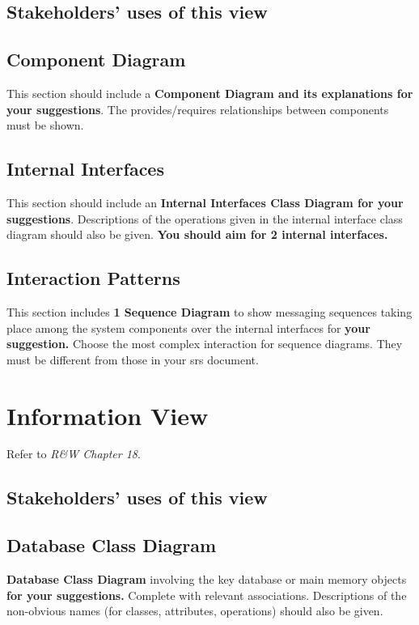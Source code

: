 \subsection{Stakeholders’ uses of this view}

\subsection{Component Diagram}

This section should include a \textbf{Component Diagram and its explanations for your suggestions}. The provides/requires relationships between components must be shown.

\subsection{Internal Interfaces}
This section should include an \textbf{Internal Interfaces Class Diagram for your suggestions}. Descriptions of the operations given in the internal interface class diagram should also be given. \textbf{You should aim for 2 internal interfaces.}

\subsection{Interaction Patterns}
This section includes \textbf{1 Sequence Diagram} to show messaging sequences taking place among the system components over the internal interfaces for \textbf{your suggestion.} Choose the most complex interaction for sequence diagrams. They must be different from those in your \gls{srs} document.



\section{Information View}

Refer to \textit{R\&W Chapter 18}. 

\subsection{Stakeholders’ uses of this view}

\subsection{Database Class Diagram}

\textbf{Database Class Diagram} involving the key database or main memory objects \textbf{for your suggestions.} Complete with relevant associations. Descriptions of the non-obvious names (for classes, attributes, operations) should also be given.

